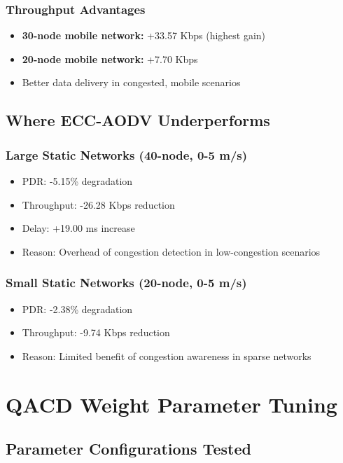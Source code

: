 \documentclass[11pt,a4paper]{article}
\begin{document}
\subsubsection{Throughput Advantages}
\begin{itemize}
    \item \textbf{30-node mobile network:} +33.57 Kbps (highest gain)
    \item \textbf{20-node mobile network:} +7.70 Kbps
    \item Better data delivery in congested, mobile scenarios
\end{itemize}

\subsection{Where ECC-AODV Underperforms}

\subsubsection{Large Static Networks (40-node, 0-5 m/s)}
\begin{itemize}
    \item PDR: -5.15\% degradation
    \item Throughput: -26.28 Kbps reduction
    \item Delay: +19.00 ms increase
    \item Reason: Overhead of congestion detection in low-congestion scenarios
\end{itemize}

\subsubsection{Small Static Networks (20-node, 0-5 m/s)}
\begin{itemize}
    \item PDR: -2.38\% degradation
    \item Throughput: -9.74 Kbps reduction
    \item Reason: Limited benefit of congestion awareness in sparse networks
\end{itemize}

\section{QACD Weight Parameter Tuning}

\subsection{Parameter Configurations Tested}
\end{document}
